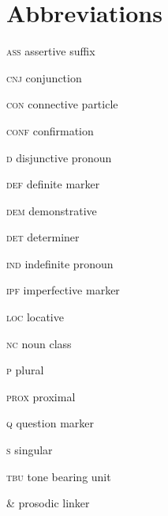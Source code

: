 \documentclass[output=paper]{langsci/langscibook}
\begin{document}
\section*{ Abbreviations}

\textsc{ass}  assertive suffix

\textsc{cnj}  conjunction

\textsc{con}  connective particle

\textsc{conf}  confirmation

\textsc{d}  disjunctive pronoun

\textsc{def}  definite marker

\textsc{dem}  demonstrative

\textsc{det}  determiner

\textsc{ind}  indefinite pronoun

\textsc{ipf}  imperfective marker

\textsc{loc}  locative

\textsc{nc}  noun class

\textsc{p}  plural

\textsc{prox}  proximal

\textsc{q}  question marker

\textsc{s}  singular

\textsc{tbu}  tone bearing unit

\& prosodic linker
\end{document}
